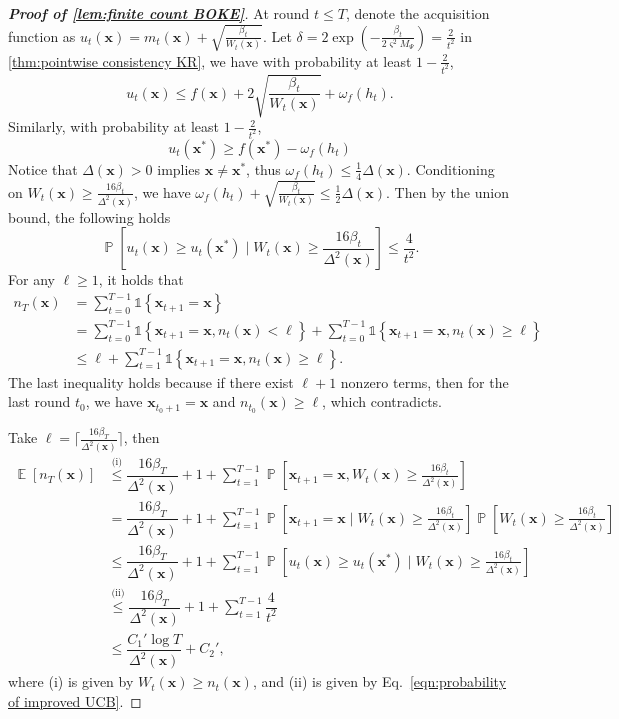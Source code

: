 \documentclass[11pt,en]{elegantpaper}
\newcommand{\x}{\bm{x}}
\newcommand{\1}{\mathds{1}}
\newcommand{\set}[1]{\left\{#1\right\}}
\DeclareMathOperator*{\E}{\mathbb{E}}
\DeclareMathOperator*{\Prob}{\mathbb{P}}
\begin{document}
\begin{proof}[\rm\bfseries Proof of \cref{lem:finite count BOKE}]
    At round $t \le T$, denote the acquisition function as $u_t(\x) = m_t(\x) + \sqrt{\frac{\beta_t}{W_t(\x)}}$. Let $\delta = 2 \exp\left(-\frac{ \beta_t}{2 \varsigma^2 M_{\Psi}}\right) = \frac{2}{t^2}$ in \cref{thm:pointwise consistency KR}, we have with probability at least $1 - \frac{2}{t^2}$,
    \[
        u_t(\x) \le f(\x) + 2 \sqrt{\dfrac{\beta_t}{W_t(\x)}} + \omega_f(h_t).
    \]
    Similarly, with probability at least $1 - \frac{2}{t^2}$,
    \[
        u_t(\x^{\ast}) \ge f(\x^{\ast}) - \omega_f(h_t)
    \]
    Notice that $\Delta(\x) > 0$ implies $\x \neq \x^{\ast}$, thus $\omega_f(h_t) \le \frac{1}{4} \Delta(\x)$. Conditioning on $W_t(\x) \ge \frac{16 \beta_t}{\Delta^2(\x)}$, we have $\omega_f(h_t) + \sqrt{\frac{\beta_t}{W_t(\x)}} \le \frac{1}{2} \Delta(\x)$. Then by the union bound, the following holds
    \begin{equation}
        \label{eqn:probability of improved UCB}
        \Prob\left[u_t(\x) \ge u_t(\x^{\ast}) \;\Big|\; W_t(\x) \ge \frac{16 \beta_t}{\Delta^2(\x)}\right] \le \dfrac{4}{t^2}.
    \end{equation}
    For any $\ell \ge 1$, it holds that
    \begin{align*}
        n_T(\x)
        & = \sum_{t=0}^{T-1} \1\set{\x_{t+1} = \x} 
        \\
        & = \sum_{t=0}^{T-1} \1\set{\x_{t+1} = \x, n_t(\x) < \ell} + \sum_{t=0}^{T-1} \1\set{\x_{t+1} = \x, n_t(\x) \ge \ell} 
        \\
        & \le \ell + \sum_{t=1}^{T-1} \1\set{\x_{t+1} = \x, n_t(\x) \ge \ell}.
    \end{align*}
    The last inequality holds because if there exist $\ell + 1$ nonzero terms, then for the last round $t_0$, we have $\x_{t_0 + 1} = \x$ and $n_{t_0}(\x) \ge \ell$, which contradicts.

    Take $\ell = \lceil \frac{16 \beta_T}{\Delta^2(\x)} \rceil$, then
    \begin{align*}
        \E[n_T(\x)]
        & \stackrel{\textrm{(i)}}{\le} \dfrac{16 \beta_T}{\Delta^2(\x)} + 1 + \sum_{t=1}^{T-1} \Prob\left[\x_{t+1} = \x, W_t(\x) \ge \frac{16 \beta_t}{\Delta^2(\x)}\right] 
        \\
        & = \dfrac{16 \beta_T}{\Delta^2(\x)} + 1 + \sum_{t=1}^{T-1} \Prob\left[\x_{t+1} = \x \;\Big|\; W_t(\x) \ge \frac{16 \beta_t}{\Delta^2(\x)}\right] \Prob\left[W_t(\x) \ge \frac{16 \beta_t}{\Delta^2(\x)}\right] 
        \\
        & \le \dfrac{16 \beta_T}{\Delta^2(\x)} + 1 + \sum_{t=1}^{T-1} \Prob\left[u_t(\x) \ge u_t(\x^{\ast}) \;\Big|\; W_t(\x) \ge \frac{16 \beta_t}{\Delta^2(\x)}\right] 
        \\
        & \stackrel{\textrm{(ii)}}{\le} \dfrac{16 \beta_T}{\Delta^2(\x)} + 1 + \sum_{t=1}^{T-1} \dfrac{4}{t^2} 
        \\
        & \le \dfrac{C_1' \log T}{\Delta^2(\x)} + C_2',
    \end{align*}
    where (i) is given by $W_t(\x) \ge n_t(\x)$, and (ii) is given by Eq.~\eqref{eqn:probability of improved UCB}.
\end{proof}




\printbibliography[heading=bibintoc, title=References]
\end{document}
